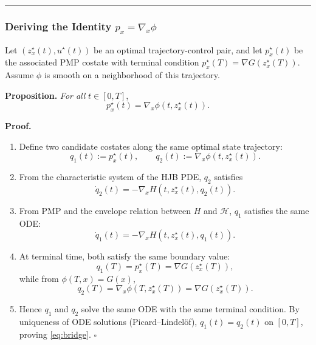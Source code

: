 \documentclass{article}
\begin{document}
\medskip\hrule\medskip

\subsubsection{Deriving the Identity $p_x = \nabla_x \phi$}

\begin{mathrequirementsbox}
Let $(z_x^\star(t), u^\star(t))$ be an optimal trajectory-control pair, and let
$p_x^\star(t)$ be the associated PMP costate with terminal condition
$p_x^\star(T) = \nabla G(z_x^\star(T))$. Assume $\phi$ is smooth on a
neighborhood of this trajectory.

\medskip

\noindent\textbf{Proposition.} \label{prop:gradient-identity} \textit{For all } $t \in [0,T]$,
\begin{equation}
    p_x^\star(t) = \nabla_x \phi(t, z_x^\star(t)).
    \label{eq:bridge}
\end{equation}

\medskip

\noindent\textbf{Proof.}
\begin{enumerate}
    \item Define two candidate costates along the same optimal state trajectory:
    \[
    q_1(t) := p_x^\star(t), \qquad
    q_2(t) := \nabla_x \phi(t, z_x^\star(t)).
    \]

    \item From the characteristic system of the HJB PDE, $q_2$ satisfies
    \[
    \dot{q}_2(t) = -\nabla_x H\!\left(t, z_x^\star(t), q_2(t)\right).
    \]

    \item From PMP and the envelope relation between $H$ and $\mathcal{H}$,
    $q_1$ satisfies the same ODE:
    \[
    \dot{q}_1(t) = -\nabla_x H\!\left(t, z_x^\star(t), q_1(t)\right).
    \]

    \item At terminal time, both satisfy the same boundary value:
    \[
    q_1(T) = p_x^\star(T) = \nabla G(z_x^\star(T)),
    \]
    while from $\phi(T,x)=G(x)$,
    \[
    q_2(T)=\nabla_x\phi(T,z_x^\star(T))=\nabla G(z_x^\star(T)).
    \]

    \item Hence $q_1$ and $q_2$ solve the same ODE with the same terminal
    condition. By uniqueness of ODE solutions (Picard--Lindel\"of),
    $q_1(t)=q_2(t)$ on $[0,T]$, proving \eqref{eq:bridge}. \hfill $\square$
\end{enumerate}
\end{mathrequirementsbox}
\end{document}
